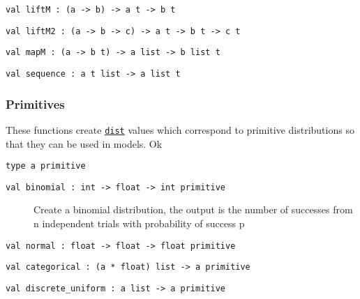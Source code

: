 \protect\hyperlink{val-liftM}{}\texttt{val\ liftM\ :\ (\textquotesingle{}a\ -\textgreater{}\ \textquotesingle{}b)\ -\textgreater{}\ \textquotesingle{}a\ t\ -\textgreater{}\ \textquotesingle{}b\ t}

\protect\hyperlink{val-liftM2}{}\texttt{val\ liftM2\ :\ (\textquotesingle{}a\ -\textgreater{}\ \textquotesingle{}b\ -\textgreater{}\ \textquotesingle{}c)\ -\textgreater{}\ \textquotesingle{}a\ t\ -\textgreater{}\ \textquotesingle{}b\ t\ -\textgreater{}\ \textquotesingle{}c\ t}

\protect\hyperlink{val-mapM}{}\texttt{val\ mapM\ :\ (\textquotesingle{}a\ -\textgreater{}\ \textquotesingle{}b\ t)\ -\textgreater{}\ \textquotesingle{}a\ list\ -\textgreater{}\ \textquotesingle{}b\ list\ t}

\protect\hyperlink{val-sequence}{}\texttt{val\ sequence\ :\ \textquotesingle{}a\ t\ list\ -\textgreater{}\ \textquotesingle{}a\ list\ t}

\hypertarget{distux5fprims}{\subsubsection{\texorpdfstring{\protect\hyperlink{distux5fprims}{}Primitives}{Primitives}}\label{distux5fprims}}

These functions create \href{index.html\#type-dist}{\texttt{dist}}
values which correspond to primitive distributions so that they can be
used in models. Ok

\protect\hyperlink{type-primitive}{}\texttt{type\ \textquotesingle{}a\ primitive}

\begin{description}
\item[{\protect\hyperlink{val-binomial}{}\texttt{val\ binomial\ :\ int\ -\textgreater{}\ float\ -\textgreater{}\ int\ primitive}}]
Create a binomial distribution, the output is the number of successes
from n independent trials with probability of success p
\end{description}

\protect\hyperlink{val-normal}{}\texttt{val\ normal\ :\ float\ -\textgreater{}\ float\ -\textgreater{}\ float\ primitive}

\protect\hyperlink{val-categorical}{}\texttt{val\ categorical\ :\ (\textquotesingle{}a\ *\ float)\ list\ -\textgreater{}\ \textquotesingle{}a\ primitive}

\protect\hyperlink{val-discreteux5funiform}{}\texttt{val\ discrete\_uniform\ :\ \textquotesingle{}a\ list\ -\textgreater{}\ \textquotesingle{}a\ primitive}

